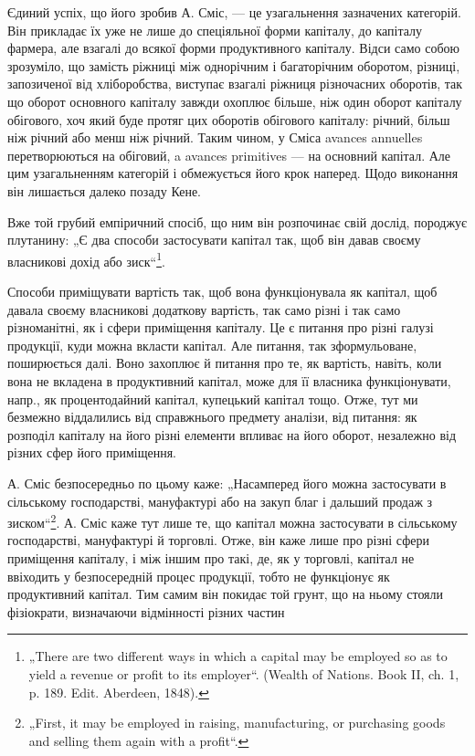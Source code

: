 Єдиний успіх, що його зробив А. Сміс, — це узагальнення зазначених
категорій. Він прикладає їх уже не лише до спеціяльної форми капіталу,
до капіталу фармера, але взагалі до всякої форми продуктивного капіталу.
Відси само собою зрозуміло, що замість ріжниці між однорічним і багаторічним
оборотом, різниці, запозиченої від хліборобства, виступає взагалі
ріжниця різночасних оборотів, так що оборот основного капіталу завжди
охоплює більше, ніж один оборот капіталу обігового, хоч який буде
протяг цих оборотів обігового капіталу: річний, більш ніж річний або
менш ніж річний. Таким чином, у Сміса avances annuelles перетворюються
на обіговий, a avances primitives — на основний капітал. Але цим узагальненням
категорій і обмежується його крок наперед. Щодо виконання він
лишається далеко позаду Кене.

Вже той грубий емпіричний спосіб, що ним він розпочинає свій дослід,
породжує плутанину: „Є два способи застосувати капітал так, щоб
він давав своєму власникові дохід або зиск“\footnote*{
„There are two different ways in which a capital may be employed so as to
yield a revenue or profit to its employer“. (Wealth of Nations. Book II, ch. 1, p. 189.
Edit. Aberdeen, 1848).
}.

Способи приміщувати вартість так, щоб вона функціонувала як капітал,
щоб давала своєму власникові додаткову вартість, так само різні
і так само різноманітні, як і сфери приміщення капіталу. Це є питання
про різні галузі продукції, куди можна вкласти капітал. Але питання, так
зформульоване, поширюється далі. Воно захоплює й питання про те, як
вартість, навіть, коли вона не вкладена в продуктивний капітал, може для
її власника функціонувати, напр., як процентодайний капітал, купецький
капітал тощо. Отже, тут ми безмежно віддалились від справжнього предмету
аналізи, від питання: як розподіл  капіталу на
його різні елементи впливає на його оборот, незалежно від різних сфер
його приміщення.

А. Сміс безпосередньо по цьому каже: „Насамперед його можна застосувати
в сільському господарстві, мануфактурі або на закуп благ і дальший
продаж з зиском“\footnote*{
„First, it may be employed in raising, manufacturing, or purchasing goods and
selling them again with a profit“.
}. А. Сміс каже тут лише те, що капітал можна
застосувати в сільському господарстві, мануфактурі й торговлі. Отже, він
каже лише про різні сфери приміщення капіталу, і між іншим про такі, де,
як у торговлі, капітал не ввіходить у безпосередній процес продукції, тобто
не функціонує як продуктивний капітал. Тим самим він покидає той грунт,
що на ньому стояли фізіократи, визначаючи відмінності різних частин
\parbreak{}  %
